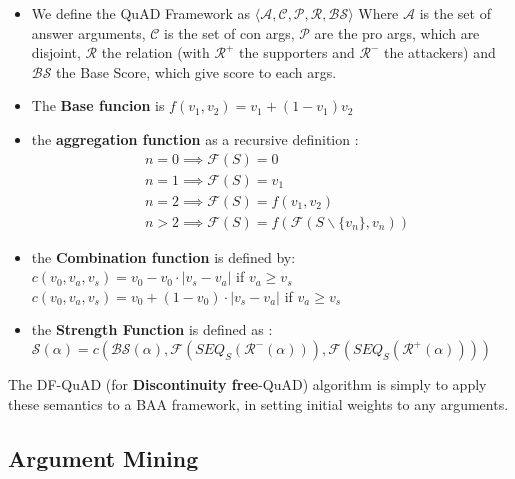 			\begin{definition}
				\begin{itemize}
					\item We define the QuAD Framework as $\langle \mathcal{A}, \mathcal{C}, \mathcal{P}, \mathcal{R}, \mathcal{BS}\rangle $ Where $\mathcal{A}$ is the set of answer arguments, $\mathcal{C}$ is the set of con args, $\mathcal{P}$ are the pro args, which are disjoint, $\mathcal{R}$ the relation (with $\mathcal{R}^+$ the supporters and $\mathcal{R}^-$ the attackers) and $\mathcal{BS}$ the Base Score, which give score to each args. 
					\item The \textbf{Base funcion} is $f(v_1, v_2) = v_1 + (1-v_1)v_2$
					\item the \textbf{aggregation function} as a recursive definition : 
					\begin{align*}
						& n=0 \implies \mathcal{F}(S)=0\\
						& n=1 \implies \mathcal{F}(S)= v_1\\
						& n=2 \implies \mathcal{F}(S)= f(v_1, v_2)\\
						& n>2 \implies \mathcal{F}(S)= f(\mathcal{F}(S\backslash \{v_n\}, v_n))
					\end{align*}
					\item the \textbf{Combination function} is defined by: \\
					$c(v_0, v_a, v_s) = v_0 - v_0 \cdot |v_s-v_a|$ if $v_a \geq v_s$\\
					$c(v_0, v_a, v_s) = v_0 + (1 - v_0 ) \cdot |v_s-v_a|$ if $v_a \geq v_s$
					\item the \textbf{Strength Function} is defined as : $\mathcal{S}(\alpha) = c(\mathcal{BS}(\alpha), \mathcal{F}(SEQ_S(\mathcal{R}^-(\alpha))), \mathcal{F}(SEQ_S(\mathcal{R}^+(\alpha))))$
				\end{itemize}
			\end{definition}

			The DF-QuAD (for \textbf{Discontinuity free}-QuAD) algorithm is simply to apply these semantics to a BAA framework, in setting initial weights to any arguments. 


	\subsection{Argument Mining}
